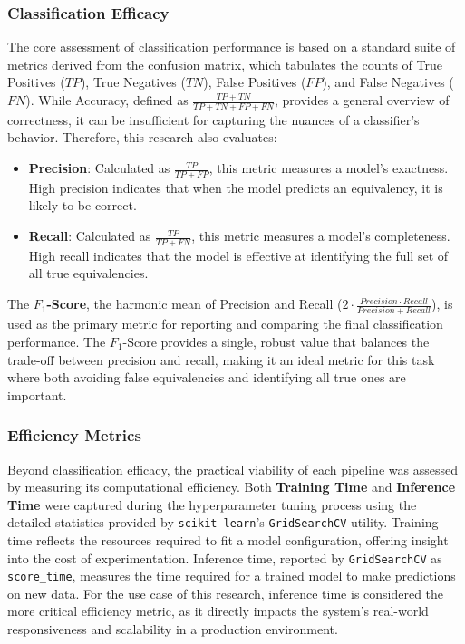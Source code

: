 \subsubsection{Classification Efficacy}\label{ch:3.4.2.1}
The core assessment of classification performance is based on a standard suite of metrics derived from the confusion matrix, which tabulates the counts of True Positives (\(TP\)), True Negatives (\(TN\)), False Positives (\(FP\)), and False Negatives (\(FN\)). While Accuracy, defined as \(\frac{TP + TN}{TP + TN + FP + FN}\), provides a general overview of correctness, it can be insufficient for capturing the nuances of a classifier's behavior. Therefore, this research also evaluates:
\begin{itemize}
    \item \textbf{Precision}: Calculated as \(\frac{TP}{TP + FP}\), this metric measures a model's exactness. High precision indicates that when the model predicts an equivalency, it is likely to be correct.
    \item \textbf{Recall}: Calculated as \(\frac{TP}{TP + FN}\), this metric measures a model's completeness. High recall indicates that the model is effective at identifying the full set of all true equivalencies.
\end{itemize}
The \textbf{\(F_1\)-Score}, the harmonic mean of Precision and Recall (\(2\cdot\frac{Precision\cdot Recall}{Precision + Recall}\)), is used as the primary metric for reporting and comparing the final classification performance. The \(F_1\)-Score provides a single, robust value that balances the trade-off between precision and recall, making it an ideal metric for this task where both avoiding false equivalencies and identifying all true ones are important.

\subsubsection{Efficiency Metrics}\label{ch:3.4.2.2}
Beyond classification efficacy, the practical viability of each pipeline was assessed by measuring its computational efficiency. Both \textbf{Training Time} and \textbf{Inference Time} were captured during the hyperparameter tuning process using the detailed statistics provided by \verb|scikit-learn|'s \verb|GridSearchCV| utility. Training time reflects the resources required to fit a model configuration, offering insight into the cost of experimentation. Inference time, reported by \verb|GridSearchCV| as \verb|score_time|, measures the time required for a trained model to make predictions on new data. For the use case of this research, inference time is considered the more critical efficiency metric, as it directly impacts the system's real-world responsiveness and scalability in a production environment.


